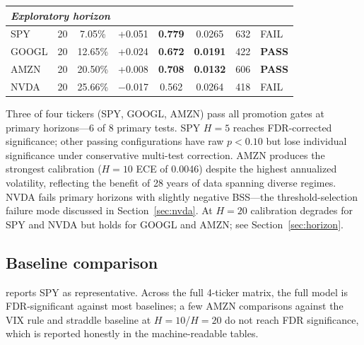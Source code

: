 \documentclass[11pt,a4paper]{article}
\begin{document}
\begin{table}[htbp]
\begin{tabular}{llcccccl}
\midrule
\multicolumn{8}{l}{\textit{Exploratory horizon}} \\
\midrule
SPY    & 20 & 7.05\%  & +0.051         & \textbf{0.779} & 0.0265          & 632 & FAIL \\
GOOGL  & 20 & 12.65\% & +0.024         & \textbf{0.672} & \textbf{0.0191} & 422 & \textbf{PASS} \\
AMZN   & 20 & 20.50\% & +0.008         & \textbf{0.708} & \textbf{0.0132} & 606 & \textbf{PASS} \\
NVDA   & 20 & 25.66\% & $-$0.017       & 0.562          & 0.0264          & 418 & FAIL \\
\bottomrule
\end{tabular}
\end{table}

Three of four tickers (SPY, GOOGL, AMZN) pass all promotion gates at primary horizons---6 of 8 primary tests. SPY $H\!=\!5$ reaches FDR-corrected significance; other passing configurations have raw $p < 0.10$ but lose individual significance under conservative multi-test correction. AMZN produces the strongest calibration ($H\!=\!10$ ECE of 0.0046) despite the highest annualized volatility, reflecting the benefit of 28 years of data spanning diverse regimes. NVDA fails primary horizons with slightly negative BSS---the threshold-selection failure mode discussed in Section~\ref{sec:nvda}. At $H\!=\!20$ calibration degrades for SPY and NVDA but holds for GOOGL and AMZN; see Section~\ref{sec:horizon}.

\subsection{Baseline comparison}
\label{sec:baselines}

 reports SPY as representative. Across the full 4-ticker matrix, the full model is FDR-significant against most baselines; a few AMZN comparisons against the VIX rule and straddle baseline at $H\!=\!10$/$H\!=\!20$ do not reach FDR significance, which is reported honestly in the machine-readable tables.
\end{document}
